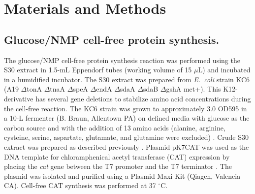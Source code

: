 \documentclass[journal=asbcd6,manuscript=article]{achemso}
\begin{document}
\clearpage

\section*{Materials and Methods}

\subsection*{Glucose/NMP cell-free protein synthesis.}
The glucose/NMP cell-free protein synthesis reaction was
performed using the S30 extract in 1.5-mL Eppendorf tubes (working volume of 15 $\mu$L) and incubated in a humidified incubator.
The S30 extract was prepared from \textit{E.~coli} strain KC6 (A19 $\Delta$tonA $\Delta$tnaA $\Delta$speA $\Delta$endA $\Delta$sdaA $\Delta$sdaB $\Delta$gshA met+).
This K12-derivative has several gene deletions to stabilize amino acid concentrations during the cell-free reaction.
The KC6 strain was grown to approximately 3.0 OD595 in a 10-L fermenter (B. Braun, Allentown PA) on defined media with glucose as the carbon source and with the addition of 13 amino acids (alanine, arginine, cysteine, serine, aspartate, glutamate, and glutamine were excluded) \cite{Zawada:2003}. Crude S30 extract was prepared as described previously \cite{Jewett:2002}.
Plasmid pK7CAT was used as the DNA template for chloramphenical acetyl transferase (CAT) expression by placing the \emph{cat} gene
between the T7 promoter and the T7 terminator \cite{Kigawa1995}.
The plasmid was isolated and purified using a Plasmid Maxi Kit (Qiagen, Valencia CA).
Cell-free CAT synthesis was performed at 37 $^{\circ}$C.
\end{document}
